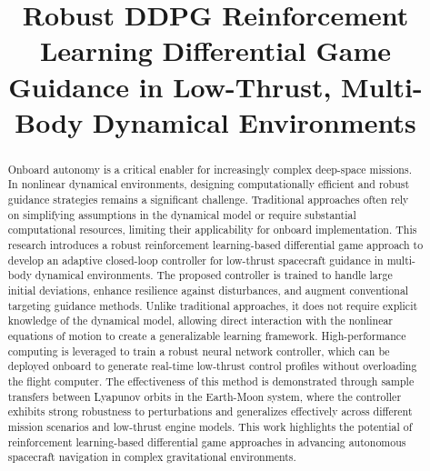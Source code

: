 \documentclass[conference]{IEEEtran}
\begin{document}
\title{Robust DDPG Reinforcement Learning Differential Game Guidance in Low-Thrust, Multi-Body Dynamical Environments}

\author{
\and
{}
}

\maketitle

\begin{abstract}
Onboard autonomy is a critical enabler for increasingly complex deep-space missions. In nonlinear dynamical environments, designing computationally efficient and robust guidance strategies remains a significant challenge. Traditional approaches often rely on simplifying assumptions in the dynamical model or require substantial computational resources, limiting their applicability for onboard implementation. This research introduces a robust reinforcement learning-based differential game approach to develop an adaptive closed-loop controller for low-thrust spacecraft guidance in multi-body dynamical environments. The proposed controller is trained to handle large initial deviations, enhance resilience against disturbances, and augment conventional targeting guidance methods. Unlike traditional approaches, it does not require explicit knowledge of the dynamical model, allowing direct interaction with the nonlinear equations of motion to create a generalizable learning framework. High-performance computing is leveraged to train a robust neural network controller, which can be deployed onboard to generate real-time low-thrust control profiles without overloading the flight computer. The effectiveness of this method is demonstrated through sample transfers between Lyapunov orbits in the Earth-Moon system, where the controller exhibits strong robustness to perturbations and generalizes effectively across different mission scenarios and low-thrust engine models. This work highlights the potential of reinforcement learning-based differential game approaches in advancing autonomous spacecraft navigation in complex gravitational environments.
\end{abstract}
\end{document}
